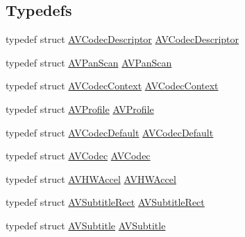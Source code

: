 \subsection*{Typedefs}
\begin{DoxyCompactItemize}
\item 
typedef struct \hyperlink{struct_a_v_codec_descriptor}{A\+V\+Codec\+Descriptor} \hyperlink{group__lavc__core_ga439af7fe133333611f4ae1174e52ee22}{A\+V\+Codec\+Descriptor}
\item 
typedef struct \hyperlink{struct_a_v_pan_scan}{A\+V\+Pan\+Scan} \hyperlink{group__lavc__core_ga29f10e0a8372f4172144b4619a534292}{A\+V\+Pan\+Scan}
\item 
typedef struct \hyperlink{struct_a_v_codec_context}{A\+V\+Codec\+Context} \hyperlink{group__lavc__core_gaf356dfbde1f9f8a35068ad9466c4afea}{A\+V\+Codec\+Context}
\item 
typedef struct \hyperlink{struct_a_v_profile}{A\+V\+Profile} \hyperlink{group__lavc__core_gaa51fda538769e5d22388b81eaf4d6ddd}{A\+V\+Profile}
\item 
typedef struct \hyperlink{group__lavc__core_ga27561af66de4a75c3da1dc61f8c5cd9a}{A\+V\+Codec\+Default} \hyperlink{group__lavc__core_ga27561af66de4a75c3da1dc61f8c5cd9a}{A\+V\+Codec\+Default}
\item 
typedef struct \hyperlink{struct_a_v_codec}{A\+V\+Codec} \hyperlink{group__lavc__core_gadf7f78e11dffa2bcb0419221625e5623}{A\+V\+Codec}
\item 
typedef struct \hyperlink{struct_a_v_h_w_accel}{A\+V\+H\+W\+Accel} \hyperlink{group__lavc__core_ga4e1af181e27d4f0eddef2a4125866884}{A\+V\+H\+W\+Accel}
\item 
typedef struct \hyperlink{struct_a_v_subtitle_rect}{A\+V\+Subtitle\+Rect} \hyperlink{group__lavc__core_ga4e22c4a274d7aadc0316535668a869c2}{A\+V\+Subtitle\+Rect}
\item 
typedef struct \hyperlink{struct_a_v_subtitle}{A\+V\+Subtitle} \hyperlink{group__lavc__core_gad1afdf89d8e5d2f9b5995ba4977d8f94}{A\+V\+Subtitle}
\end{DoxyCompactItemize}

